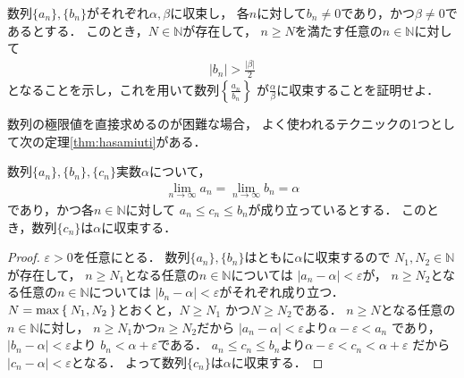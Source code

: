      \begin{que} \label{que:suretuconvsyou}
       数列$\{ a_n \} ,  \{ b_n \}$がそれぞれ$\alpha ,  \beta$に収束し，
       各$n$に対して$b_n \neq 0$であり，かつ$\beta \neq 0$であるとする．
       このとき，$N \in \mathbb{N}$が存在して，
       $n \geq N$を満たす任意の$n \in \mathbb{N}$に対して
       \begin{align*}
         \lvert b_n \rvert > \frac{ \lvert \beta \rvert } {2}
       \end{align*}
       となることを示し，これを用いて数列$\left \{ \displaystyle \frac{a_n}{b_n} \right\}$
       が$\displaystyle \frac{ \alpha }{\beta}$に収束することを証明せよ．
     \end{que}
     数列の極限値を直接求めるのが困難な場合，
     よく使われるテクニックの1つとして次の定理\ref{thm:hasamiuti}がある．
     
     \begin{thm}[はさみうちの原理] \label{thm:hasamiuti}
       数列$\{ a_n \} ,  \{ b_n \} ,  \{ c_n \}$実数$\alpha$について，
       \begin{align*}
         \lim_{n \to \infty} a_n = \lim_{ n \to \infty} b_n = \alpha
       \end{align*}
       であり，かつ各$n \in \mathbb{N}$に対して
       $a_n \leq c_n \leq b_n $が成り立っているとする．
       このとき，数列$\{ c_n \}$は$\alpha$に収束する．
     \end{thm}
     \begin{proof}
       $\varepsilon >0$を任意にとる．
       数列$\{ a_n \} ,  \{ b_n \}$はともに$\alpha$に収束するので
       $N_1 ,  N_2 \in \mathbb{N}$が存在して，
       $n \geq N_1$となる任意の$n \in \mathbb{N}$については
       $\lvert a_n - \alpha \rvert < \varepsilon$が，
       $n \geq N_2$となる任意の$n \in \mathbb{N}$については
       $\lvert b_n - \alpha \rvert < \varepsilon$がそれぞれ成り立つ．
       $N= \max \Set{N_1,  N_2}$とおくと，$N \geq N_1$
       かつ$N \geq N_2$である．
       $n \geq N$となる任意の$n \in \mathbb{N}$に対し，
       $n \geq N_1$かつ$n \geq N_2$だから
       $\lvert a_n - \alpha \rvert < \varepsilon $より$\alpha - \varepsilon <a_n$
       であり，$\lvert b_n - \alpha \rvert< \varepsilon$より
       $b_n < \alpha + \varepsilon$である．
       $a_n \leq c_n \leq b_n$より$\alpha - \varepsilon < c_n < \alpha + \varepsilon$
       だから$\lvert c_n - \alpha \rvert < \varepsilon$となる．
       よって数列$\{ c_n \}$は$\alpha$に収束する．
     \end{proof}


